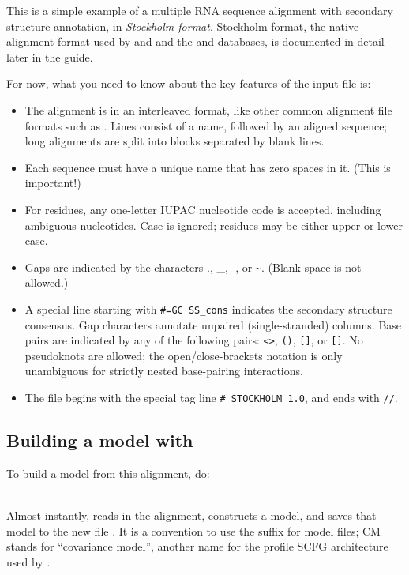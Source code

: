 This is a simple example of a multiple RNA sequence alignment with
secondary structure annotation, in \emph{Stockholm format}. Stockholm
format, the native alignment format used by  and
 and the  and 
databases, is documented in detail later in the guide.

For now, what you need to know about the key features of the input file is:
\begin{itemize}
\item The alignment is in an interleaved format, like other
common alignment file formats such as .
Lines consist of a name, followed by an aligned sequence;
long alignments are split into blocks separated by blank lines.
\item Each sequence must have a unique name that has zero spaces in it. (This is important!)
\item For residues, any one-letter IUPAC nucleotide code is accepted,
      including ambiguous nucleotides. Case is ignored; residues
      may be either upper or lower case.
\item Gaps are indicated by the characters ., \_, -, or \verb+~+.
      (Blank space is not allowed.)
\item A special line starting with {\small\verb+#=GC SS_cons+} indicates
      the secondary structure consensus. Gap characters annotate
      unpaired (single-stranded) columns. Base pairs are indicated
      by any of the following pairs: \verb+<>+, \verb+()+, \verb+[]+,
      or \verb+[]+. No pseudoknots are allowed; the
      open/close-brackets notation is only unambiguous for strictly
      nested base-pairing interactions.
\item The file begins with the special tag line
      {\small\verb+# STOCKHOLM 1.0+}, and ends with {\small\verb+//+}.
\end{itemize}

\subsection{Building a model with }

To build a model from this alignment, do:

\\

Almost instantly,  reads in the alignment, constructs a
model, and saves that model to the new file . It is a
convention to use the  suffix for model files; CM stands for
``covariance model'', another name for the profile SCFG architecture
used by  \cite{Eddy94}.

